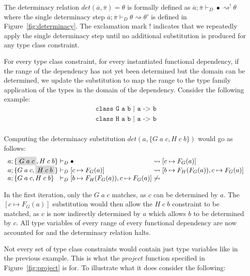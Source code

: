 The determinacy relation $det(\overline{a},\overline{\pi}) = \theta$ is formally
defined as $\overline{a};\overline{\pi} \vdash_{D} \bullet \rightsquigarrow^!
\theta$ where the single determinacy step $\overline{a};\overline{\pi}
\vdash_{D} \theta \rightsquigarrow \theta'$ is defined in
Figure~\ref{fig:determinacy}. The exclamation mark $!$ indicates that we
repeatedly apply the single determinacy step until no additional substitution is
produced for any type class constraint.

For every type class constraint, for every instantiated functional dependency,
if the range of the dependency has not yet been determined but the domain can be
determined, we update the substitution to map the range to the type family
application of the types in the domain of the dependency. Consider the following
example:
\[
\begin{array}{l}
\texttt{class G a b | a -> b}\\
\texttt{class H a b | a -> b}\\
\end{array}
\]

Computing the determinacy substitution $det(a, \{G \; a \; c, H \; c \; b \} )$
would go as follows:
\[
\begin{array}{l@{\hspace{1mm}}l@{\hspace{1mm}}c@{\hspace{1mm}}l}
a; \{\highlight{G \; a \; c}, H \; c \; b\} &\vdash_{D} \bullet
&\rightsquigarrow& [c \mapsto F_G(a)]
\\
a; \{G \; a \; c, \highlight{H \; c \; b}\} &\vdash_{D}  [c \mapsto F_G(a)]
&\rightsquigarrow& [b \mapsto F_H(F_G(a)), c \mapsto F_G(a)]
\\
a; \{G \; a \; c, H \; c \; b\} &\vdash_{D}  [b \mapsto F_H(F_G(a)), c \mapsto
F_G(a)] &\not\rightsquigarrow&
\end{array}
\]

In the first iteration, only the $G \; a \; c$ matches, as $c$ can be determined
by $a$. The $[c \mapsto F_G(a)]$ substitution would then allow the $H \; c \; b$
constraint to be matched, as $c$ is now indirectly determined by $a$ which
allows $b$ to be determined by $c$. All type variables of every range of every
functional dependency are now accounted for and the determinacy relation halts.

Not every set of type class constraints would contain just type variables like
in the previous example. This is what the $project$ function specified in
Figure~\ref{fig:project} is for. To illustrate what it does consider the
following:

